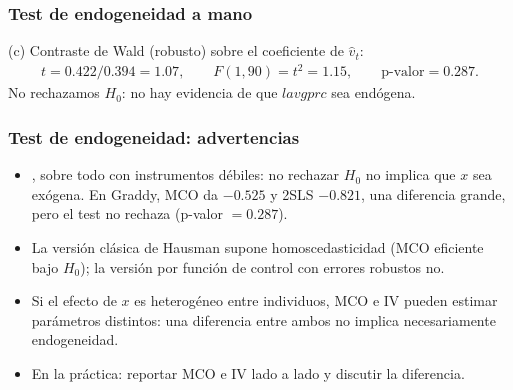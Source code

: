\documentclass[t, compress, spanish, aspectratio=169]{beamer}
\newcommand{\term}[1]{\structure{\textbf{#1}}} %
\begin{document}
\begin{frame}
	\frametitle{Test de endogeneidad a mano}
	(c) Contraste de Wald (robusto) sobre el coeficiente de $\hat v_t$:
	\begin{align*}
		t=0.422/0.394=1.07, \qquad F(1,90)=t^2=1.15, \qquad \text{p-valor}=0.287.
	\end{align*}
	No rechazamos $H_0$: no hay evidencia de que $lavgprc$ sea end\'ogena.
\end{frame}
\begin{frame}
	\frametitle{Test de endogeneidad: advertencias}
	\begin{itemize}
		\item \term{Poco poder}, sobre todo con instrumentos d\'ebiles: no rechazar $H_0$ no implica que $x$ sea ex\'ogena. En Graddy, MCO da $-0.525$ y 2SLS $-0.821$, una diferencia grande, pero el test no rechaza (p-valor $=0.287$).
		\item La versi\'on cl\'asica de Hausman supone homoscedasticidad (MCO eficiente bajo $H_0$); la versi\'on por funci\'on de control con errores robustos no.
		\item Si el efecto de $x$ es heterog\'eneo entre individuos, MCO e IV pueden estimar par\'ametros distintos: una diferencia entre ambos no implica necesariamente endogeneidad.
		\item En la pr\'actica: reportar MCO e IV lado a lado y discutir la diferencia.
	\end{itemize}
\end{frame}
\end{document}
